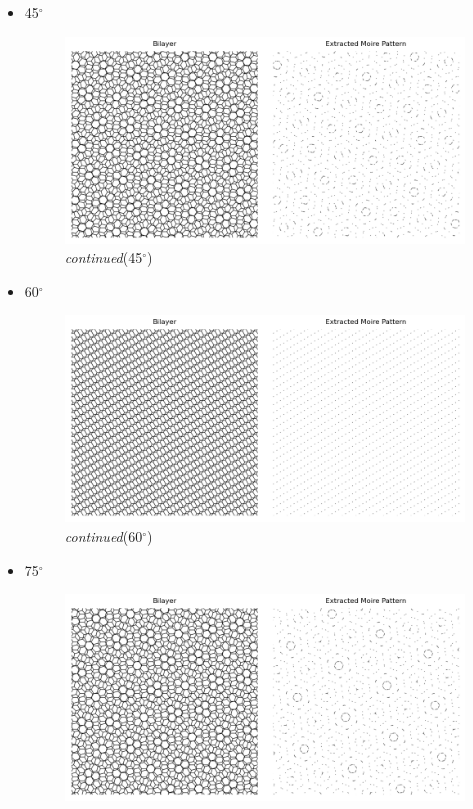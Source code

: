 \documentclass[12pt,a4paper]{article}
\begin{document}
\begin{CJK}{UTF8}{bkai}
\begin{itemize}
    \clearpage
    \item 45$^\circ$
    \begin{figure}[h]
        \centering
        \vspace{-0.5cm}
        \includegraphics[width=0.65\linewidth]{figures/45degree_moire.png}
        \vspace{-0.5cm}
        \caption{\textit{continued}(45$^\circ$)}
        \label{fig:moire_45_extract}
    \end{figure}
    \item 60$^\circ$
    \begin{figure}[h]
        \centering
        \vspace{-0.5cm}
        \includegraphics[width=0.65\linewidth]{figures/60degree_moire.png}
        \vspace{-0.5cm}
        \caption{\textit{continued}(60$^\circ$)}
        \label{fig:moire_60_extract}
    \end{figure}
    \item 75$^\circ$
    \begin{figure}[h]
        \centering
        \vspace{-0.5cm}
        \includegraphics[width=0.65\linewidth]{figures/75degree_moire.png}

\end{figure}
\end{itemize}
\end{CJK}
\end{document}
